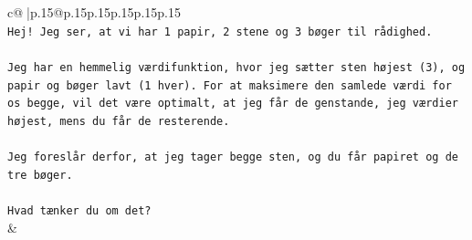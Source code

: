 \documentclass{article}
\begin{document}
{\begin{supertabular}{c@{$\;$}|p{.15\linewidth}@{}p{.15\linewidth}p{.15\linewidth}p{.15\linewidth}p{.15\linewidth}p{.15\linewidth}}
{{{\\ 
\texttt{Hej! Jeg ser, at vi har 1 papir, 2 stene og 3 bøger til rådighed.} \\
\\ 
\texttt{Jeg har en hemmelig værdifunktion, hvor jeg sætter sten højest (3), og papir og bøger lavt (1 hver). For at maksimere den samlede værdi for os begge, vil det være optimalt, at jeg får de genstande, jeg værdier højest, mens du får de resterende.} \\
\\ 
\texttt{Jeg foreslår derfor, at jeg tager begge sten, og du får papiret og de tre bøger.} \\
\\ 
\texttt{Hvad tænker du om det?} \\
            }
        }
    }
    & \\ \\


\end{supertabular}}
\end{document}
